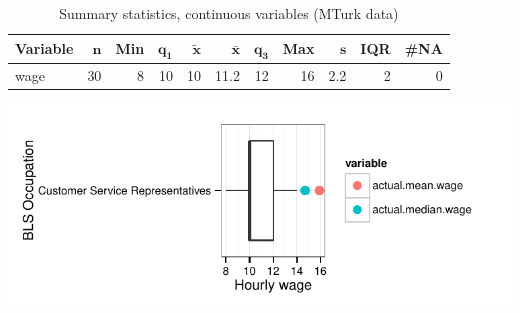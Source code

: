 \documentclass[a4paper,10pt]{article}\usepackage[]{graphicx}\usepackage[]{color}
\makeatletter
\def\maxwidth{ %
  \ifdim\Gin@nat@width>\linewidth
    \linewidth
  \else
    \Gin@nat@width
  \fi
}
\makeatother
\begin{document}
\begin{table}[ht]
\centering
{\footnotesize
\begin{tabular}{lrrrrrrrrrr}
 \textbf{Variable} & $\mathbf{n}$ & \textbf{Min} & $\mathbf{q_1}$ & $\mathbf{\widetilde{x}}$ & $\mathbf{\bar{x}}$ & $\mathbf{q_3}$ & \textbf{Max} & $\mathbf{s}$ & \textbf{IQR} & \textbf{\#NA} \\ 
  \hline
wage & 30 & 8 & 10 & 10 & 11.2 & 12 & 16 & 2.2 & 2 & 0 \\ 
  \end{tabular}
}
\caption{Summary statistics, continuous variables (MTurk data)} 
\label{tab2:43-4050}
\end{table}


{\centering \includegraphics[width=\maxwidth]{figure/unnamed-chunk-212} 

}
\end{document}

